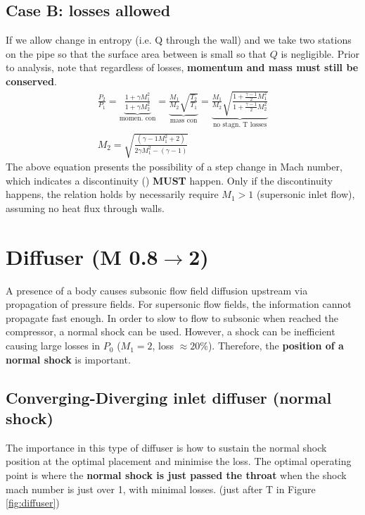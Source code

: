 \documentclass[a4paper,10pt]{article}
\begin{document}
\subsection{Case B: losses allowed}
If we allow change in entropy (i.e. Q through the wall) and we take two stations on the pipe so that the surface area between is small so that $Q$ is negligible. Prior to analysis, note that regardless of losses, \textbf{momentum and mass must still be conserved}.
\begin{gather*}
    \frac{P_2}{P_1} = \underbrace{\frac{1+\gamma M_1^2}{1+\gamma M_2^2}}_\text{momen. con} = \underbrace{\frac{M_1}{M_2}\sqrt{\frac{T_2}{T_1}}}_\text{mass con} = \underbrace{\frac{M_1}{M_2}\sqrt{\frac{1+\frac{\gamma-1}{2}M_1^2}{1+\frac{\gamma-1}{2}M_2^2}}}_\text{no stagn. T losses}\\
    \boxed{M_2=\sqrt{\frac{(\gamma-1M_1^2+2)}{2\gamma M_1^2-(\gamma-1)}}}
\end{gather*}
The above equation presents the possibility of a step change in Mach number, which indicates a discontinuity () \textbf{MUST} happen. Only if the discontinuity happens, the relation holds by necessarily require $M_1>1$ (supersonic inlet flow), assuming no heat flux through walls. 



\section{Diffuser (M 0.8$\rightarrow$2)}
A presence of a body causes subsonic flow field diffusion upstream via propagation of pressure fields. For supersonic flow fields, the information cannot propagate fast enough. In order to slow to flow to subsonic when reached the compressor, a normal shock can be used. However, a shock can be inefficient causing large losses in $P_0$ ($M_1=2$, loss $\approx20\%$). Therefore, the \textbf{position of a normal shock} is important. 

\subsection{Converging-Diverging inlet diffuser (normal shock)}
The importance in this type of diffuser is how to sustain the normal shock position at the optimal placement and minimise the loss. The optimal operating point is where the \textbf{normal shock is just passed the throat} when the shock mach number is just over 1, with minimal losses. (just after T in Figure \ref{fig:diffuser})
\end{document}
